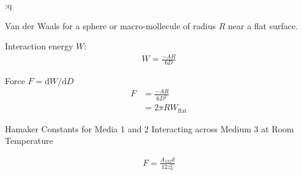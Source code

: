 :q


Van der Waals for a sphere or macro-mollecule of radius $R$ near a flat
surface.

Interaction energy $W$:
\begin{align}
  W=\frac{-AR}{6D}
\end{align}

Force $F=\mathrm{d}W/\mathrm{d}D$
\begin{align}
  F & =\frac{-AR}{6D^2}     \\
    & =2\pi R W_\text{flat}
\end{align}

Hamaker Constants for Media 1 and 2 Interacting across Medium 3
at Room Temperature

\begin{align}
  F=\frac{A_{132} d}{12 z_\alpha^2}
\end{align}
